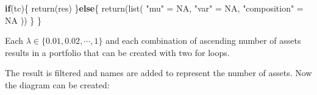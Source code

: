 \documentclass[
  oneside]{book}
\newenvironment{Shaded}{\begin{snugshade}}{\end{snugshade}}
\newcommand{\AttributeTok}[1]{\textcolor[rgb]{0.77,0.63,0.00}{#1}}
\newcommand{\ConstantTok}[1]{\textcolor[rgb]{0.00,0.00,0.00}{#1}}
\newcommand{\ControlFlowTok}[1]{\textcolor[rgb]{0.13,0.29,0.53}{\textbf{#1}}}
\newcommand{\DecValTok}[1]{\textcolor[rgb]{0.00,0.00,0.81}{#1}}
\newcommand{\FloatTok}[1]{\textcolor[rgb]{0.00,0.00,0.81}{#1}}
\newcommand{\FunctionTok}[1]{\textcolor[rgb]{0.00,0.00,0.00}{#1}}
\newcommand{\NormalTok}[1]{#1}
\newcommand{\OtherTok}[1]{\textcolor[rgb]{0.56,0.35,0.01}{#1}}
\newcommand{\SpecialCharTok}[1]{\textcolor[rgb]{0.00,0.00,0.00}{#1}}
\newcommand{\StringTok}[1]{\textcolor[rgb]{0.31,0.60,0.02}{#1}}
\begin{document}
\begin{Shaded}
\begin{Highlighting}[]
  \ControlFlowTok{if}\NormalTok{(tc)\{}
    \FunctionTok{return}\NormalTok{(res)}
\NormalTok{  \}}\ControlFlowTok{else}\NormalTok{\{}
    \FunctionTok{return}\NormalTok{(}\FunctionTok{list}\NormalTok{(}
      \StringTok{"mu"} \OtherTok{=} \ConstantTok{NA}\NormalTok{,}
      \StringTok{"var"} \OtherTok{=} \ConstantTok{NA}\NormalTok{,}
      \StringTok{"composition"} \OtherTok{=} \ConstantTok{NA}
\NormalTok{    ))}
\NormalTok{  \}}
\NormalTok{\}}
\end{Highlighting}
\end{Shaded}

Each \(\lambda \in \{0.01, 0.02, \cdots, 1\}\) and each combination of ascending number of assets results in a portfolio that can be created with two for loops.

\begin{Shaded}
\end{Shaded}

The result is filtered and names are added to represent the number of assets. Now the diagram can be created:
\end{document}
